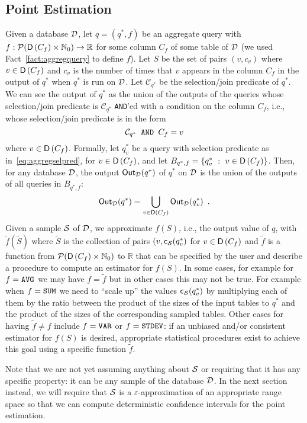 \subsection{Point Estimation}\label{sec:pointest}
Given a database ${\cal D}$, let $q=(q^*,f)$ be an aggregate query with
$f:\mathcal{P}(\mathsf{D}\left(C_f\right)\times\mathbb{N}_0)\to\mathbb{R}$ for some column $C_f$ of some
table of ${\cal D}$ (we used Fact~\ref{fact:aggregquery} to define $f$). Let $S$ be the
set of pairs $(v,c_v)$ where $v\in \mathsf{D}\left(C_f\right)$ and $c_v$ is the number of times
that $v$ appears in the column $C_f$ in the output of $q^*$ when $q^*$ is run on
${\cal D}$. Let $\mathcal{C}_{q^*}$ be the selection/join predicate of $q^*$. We can
see the output of $q^*$ as the union of the outputs of the queries whose
selection/join predicate is $\mathcal{C}_{q^*}$
\texttt{AND}'ed with a condition on the column $C_f$, i.e., whose selection/join
predicate is in the form
\begin{equation}\label{eq:aggregselpred}
  \mathcal{C}_{q^*} \text{\texttt{ AND }} C_f=v
\end{equation}
where $v\in\mathsf{D}\left(C_f\right)$. Formally, let $q^*_v$ be a query with selection
predicate as in~\eqref{eq:aggregselpred}, for $v\in\mathsf{D}\left(C_f\right)$, and let
$B_{q^*,f}=\{q^*_v ~:~ v\in\mathsf{D}\left(C_f\right)\}$. Then, for any database ${\cal D}$, the
output $\mathsf{Out}_{\cal D}(q^*)$ of $q^*$ on ${\cal D}$ is the union of the outputs of all
queries in $B_{q^*,f}$:
\[ \mathsf{Out}_{\cal D}(q^*)=\bigcup_{v\in\mathsf{D}\left(C_f\right)}\mathsf{Out}_{\cal D}(q^*_v)\enspace.
\]
Given a sample ${\cal S}$ of ${\cal D}$, we approximate $f(S)$, i.e., the output value of $q$,
with $\tilde f(\tilde S)$ where $\tilde S$ is the collection of pairs
$(v,\mathsf{c}_{\cal S}(q^*_v)$ for $v\in\mathsf{D}\left(C_f\right)$ and $\tilde f$ is a function from
$\mathcal{P}(\mathsf{D}\left(C_f\right)\times\mathbb{N}_0)$ to $\mathbb{R}$ that can be
specified by the user and describe a procedure to compute an estimator for
$f(S)$. In some cases, for example for $f=\text{\texttt{AVG}}$ we may have
$f=\tilde f$ but in other cases this may not
be true. For example when $f=\text{\texttt{SUM}}$ we need to ``scale up'' the
values $\mathsf{c}_{\cal S}(q^*_v)$ by multiplying each of them by the ratio between the
 product of the sizes of the input tables to $q^*$ and the product of the sizes
 of the corresponding sampled tables. Other cases for having $\tilde f\neq f$
 include $f=\text{\texttt{VAR}}$ or $f=\text{\texttt{STDEV}}$: if an unbiased
 and/or consistent estimator for $f(S)$ is desired, appropriate statistical
 procedures exist to achieve this goal using a specific function $\tilde f$.

Note that we are not yet assuming anything about ${\cal S}$ or requiring that it has
any specific property: it can be any sample of the database ${\cal D}$. In the next
section instead, we will require that ${\cal S}$ is a $\varepsilon$-approximation of
an appropriate range space so that we can compute deterministic confidence
intervals for the point estimation.

